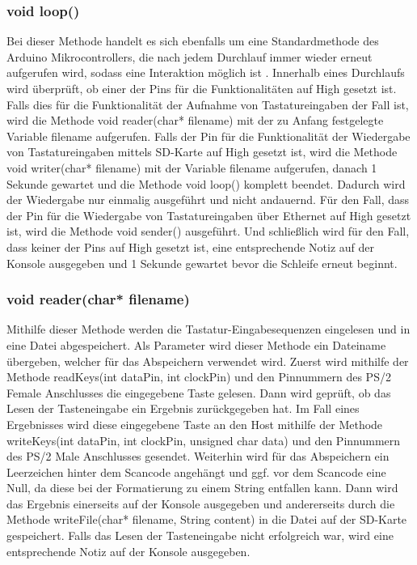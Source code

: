 \subsubsection{void loop()}
Bei dieser Methode handelt es sich ebenfalls um eine Standardmethode des Arduino Mikrocontrollers, die nach jedem Durchlauf immer wieder erneut aufgerufen wird, sodass eine Interaktion möglich ist \cite{arduino_language}. Innerhalb eines Durchlaufs wird überprüft, ob einer der Pins für die Funktionalitäten auf High gesetzt ist. Falls dies für die Funktionalität der Aufnahme von Tastatureingaben der Fall ist, wird die Methode void reader(char* filename) mit der zu Anfang festgelegte Variable filename aufgerufen. Falls der Pin für die Funktionalität der Wiedergabe von Tastatureingaben mittels SD-Karte auf High gesetzt ist, wird die Methode void writer(char* filename) mit der Variable filename aufgerufen, danach 1 Sekunde gewartet und die Methode void loop() komplett beendet. Dadurch wird der Wiedergabe nur einmalig ausgeführt und nicht andauernd. Für den Fall, dass der Pin für die Wiedergabe von Tastatureingaben über Ethernet auf High gesetzt ist, wird die Methode void sender() ausgeführt. Und schließlich wird für den Fall, dass keiner der Pins auf High gesetzt ist, eine entsprechende Notiz auf der Konsole ausgegeben und 1 Sekunde gewartet bevor die Schleife erneut beginnt.

\subsubsection{void reader(char* filename)}
Mithilfe dieser Methode werden die Tastatur-Eingabesequenzen eingelesen und in eine Datei abgespeichert. Als Parameter wird dieser Methode ein Dateiname übergeben, welcher für das Abspeichern verwendet wird. Zuerst wird mithilfe der Methode readKeys(int dataPin, int clockPin) und den Pinnummern des PS/2 Female Anschlusses die eingegebene Taste gelesen. Dann wird geprüft, ob das Lesen der Tasteneingabe ein Ergebnis zurückgegeben hat. Im Fall eines Ergebnisses wird diese eingegebene Taste an den Host mithilfe der Methode writeKeys(int dataPin, int clockPin, unsigned char data) und den Pinnummern des PS/2 Male Anschlusses gesendet. Weiterhin wird für das Abspeichern ein Leerzeichen hinter dem Scancode angehängt und ggf. vor dem Scancode eine Null, da diese bei der Formatierung zu einem String entfallen kann. Dann wird das Ergebnis einerseits auf der Konsole ausgegeben und andererseits durch die Methode writeFile(char* filename, String content) in die Datei auf der SD-Karte gespeichert. Falls das Lesen der Tasteneingabe nicht erfolgreich war, wird eine entsprechende Notiz auf der Konsole ausgegeben.


